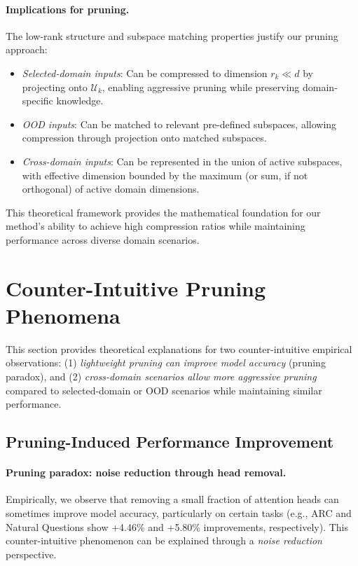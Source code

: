 \paragraph{Implications for pruning.}
The low-rank structure and subspace matching properties justify our pruning approach:
\begin{itemize}
    \item \emph{Selected-domain inputs}: Can be compressed to dimension $r_k \ll d$ by projecting onto $\mathcal{U}_k$, enabling aggressive pruning while preserving domain-specific knowledge.
    \item \emph{OOD inputs}: Can be matched to relevant pre-defined subspaces, allowing compression through projection onto matched subspaces.
    \item \emph{Cross-domain inputs}: Can be represented in the union of active subspaces, with effective dimension bounded by the maximum (or sum, if not orthogonal) of active domain dimensions.
\end{itemize}

This theoretical framework provides the mathematical foundation for our method's ability to achieve high compression ratios while maintaining performance across diverse domain scenarios.

\section{Counter-Intuitive Pruning Phenomena}
\label{app:math_pruning_paradox}

This section provides theoretical explanations for two counter-intuitive empirical observations: (1) \emph{lightweight pruning can improve model accuracy} (pruning paradox), and (2) \emph{cross-domain scenarios allow more aggressive pruning} compared to selected-domain or OOD scenarios while maintaining similar performance.

\subsection{Pruning-Induced Performance Improvement}
\label{app:math_pruning_improvement}

\paragraph{Pruning paradox: noise reduction through head removal.}
Empirically, we observe that removing a small fraction of attention heads can sometimes improve model accuracy, particularly on certain tasks (e.g., ARC and Natural Questions show +4.46\% and +5.80\% improvements, respectively).
This counter-intuitive phenomenon can be explained through a \emph{noise reduction} perspective.

